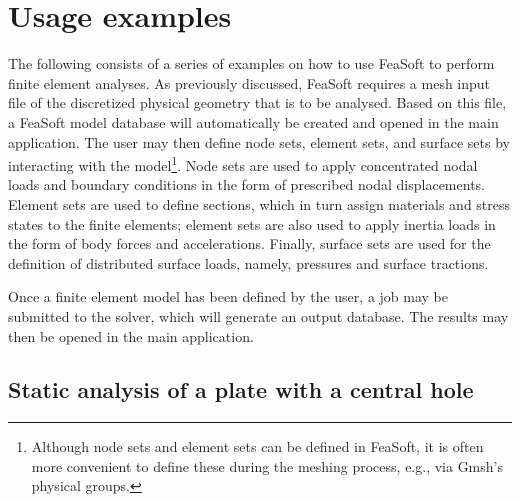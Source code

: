 \documentclass[
    11pt,        %
    a4paper,     %
    final,       %
    fleqn,       %
    notitlepage, %
    onecolumn,   %
    oneside,     %
]{article}
\begin{document}

\section{Usage examples}

The following consists of a series of examples on how to use FeaSoft to perform finite element analyses. As previously discussed, FeaSoft requires a mesh input file of the discretized physical geometry that is to be analysed. Based on this file, a FeaSoft model database will automatically be created and opened in the main application. The user may then define node sets, element sets, and surface sets by interacting with the model\footnote{Although node sets and element sets can be defined in FeaSoft, it is often more convenient to define these during the meshing process, e.g., via Gmsh's physical groups.}. Node sets are used to apply concentrated nodal loads and boundary conditions in the form of prescribed nodal displacements. Element sets are used to define sections, which in turn assign materials and stress states to the finite elements; element sets are also used to apply inertia loads in the form of body forces and accelerations. Finally, surface sets are used for the definition of distributed surface loads, namely, pressures and surface tractions.

Once a finite element model has been defined by the user, a job may be submitted to the solver, which will generate an output database. The results may then be opened in the main application.

\subsection{Static analysis of a plate with a central hole}
\end{document}
